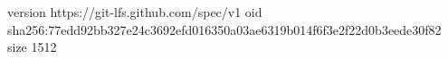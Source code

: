version https://git-lfs.github.com/spec/v1
oid sha256:77edd92bb327e24c3692efd016350a03ae6319b014f6f3e2f22d0b3eede30f82
size 1512
